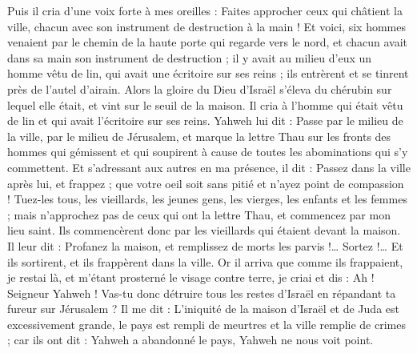 \begin{multicols}{2}
\VerseOne{}Puis il cria d'une voix forte à mes oreilles : Faites approcher ceux qui châtient la ville, chacun avec son instrument de destruction à la main !
Et voici, six hommes venaient par le chemin de la haute porte qui regarde vers le nord, et chacun avait dans sa main son instrument de destruction ; il y avait au milieu d'eux un homme vêtu de lin, qui avait une écritoire sur ses reins ; ils entrèrent et se tinrent près de l'autel d'airain.
Alors la gloire du Dieu d'Israël s'éleva du chérubin sur lequel elle était, et vint sur le seuil de la maison. Il cria à l'homme qui était vêtu de lin et qui avait l'écritoire sur ses reins.
Yahweh lui dit : Passe par le milieu de la ville, par le milieu de Jérusalem, et marque la lettre Thau sur les fronts des hommes qui gémissent et qui soupirent à cause de toutes les abominations qui s'y commettent.
Et s'adressant aux autres en ma présence, il dit : Passez dans la ville après lui, et frappez ; que votre oeil soit sans pitié et n'ayez point de compassion !
Tuez-les tous, les vieillards, les jeunes gens, les vierges, les enfants et les femmes ; mais n'approchez pas de ceux qui ont la lettre Thau, et commencez par mon lieu saint. Ils commencèrent donc par les vieillards qui étaient devant la maison.
Il leur dit : Profanez la maison, et remplissez de morts les parvis !… Sortez !… Et ils sortirent, et ils frappèrent dans la ville.
Or il arriva que comme ils frappaient, je restai là, et m'étant prosterné le visage contre terre, je criai et dis : Ah ! Seigneur Yahweh ! Vas-tu donc détruire tous les restes d'Israël en répandant ta fureur sur Jérusalem ?
Il me dit : L'iniquité de la maison d'Israël et de Juda est excessivement grande, le pays est rempli de meurtres et la ville remplie de crimes ; car ils ont dit : Yahweh a abandonné le pays, Yahweh ne nous voit point.

\end{multicols}
